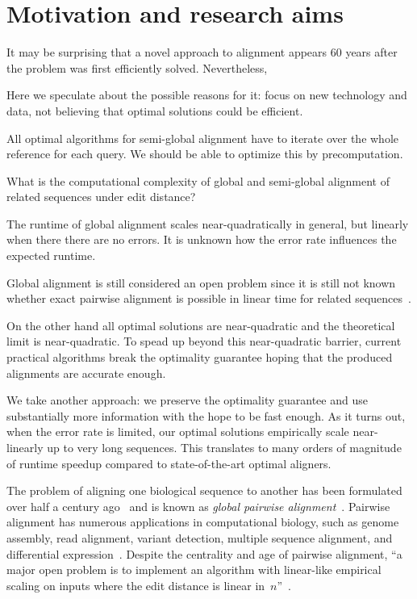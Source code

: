 \section*{Motivation and research aims}

It may be surprising that a novel approach to alignment appears 60 years after
the problem was first efficiently solved. Nevertheless, 

Here we speculate about the possible
reasons for it: focus on new technology and data, not believing that optimal
solutions could be efficient.


All optimal algorithms for semi-global alignment have to iterate over the whole
reference for each query. We should be able to optimize this by precomputation.

\begin{problem}
    What is the computational complexity of global and semi-global alignment of
    related sequences under edit distance?
\end{problem}

The runtime of global alignment scales near-quadratically in general, but
linearly when there there are no errors. It is unknown how the error rate
influences the expected runtime.

Global alignment is still considered an open problem since it is still not known
whether exact pairwise alignment is possible in linear time for related
sequences~\citep{medvedev2022theoretical}. 

On the other hand all optimal solutions are near-quadratic and the theoretical
limit is near-quadratic. To spead up beyond this near-quadratic barrier, current
practical algorithms break the optimality guarantee hoping that the produced
alignments are accurate enough. 

We take another approach: we preserve the optimality guarantee and use
substantially more information with the hope to be fast enough. As it turns out,
when the error rate is limited, our optimal solutions empirically scale
near-linearly up to very long sequences. This translates to many orders of
magnitude of runtime speedup compared to state-of-the-art optimal aligners.

The problem of aligning one biological sequence to another has been formulated
over half a century ago~\citep{needleman1970general} and is known as
\emph{global pairwise alignment}~\citep{navarro2001guided}. Pairwise alignment
has numerous applications in computational biology, such as genome assembly,
read alignment, variant detection, multiple sequence alignment, and differential
expression~\citep{prjibelski2018sequence}. Despite the centrality and age of
pairwise alignment, ``a major open problem is to implement an algorithm with linear-like
empirical scaling on inputs where the edit distance is linear
in~$n$''~\citep{medvedev2022theoretical}.

